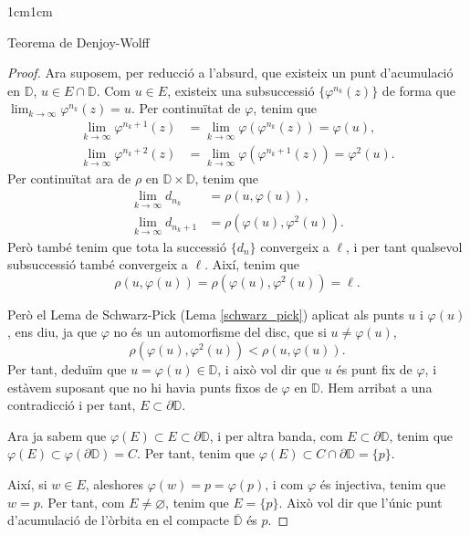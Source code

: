 \begin{adjustwidth}{1cm}{1cm}
\begin{subsection}{Teorema de Denjoy-Wolff}
\begin{proof}
        Ara suposem, per reducció a l'absurd, que existeix un punt d'acumulació en $\mathbb{D}$, $u\in E\cap \mathbb{D}$. Com $u\in E$, existeix una subsuccessió $\{\varphi^{n_k}(z)\}$ de forma que $\displaystyle\lim_{k\to\infty}\varphi^{n_k}(z)=u$. Per continuïtat de $\varphi$, tenim que 
        \begin{equation*}
            \begin{aligned}
                \lim_{k\to\infty}\varphi^{n_k+1}(z) &=\lim_{k\to\infty}\varphi(\varphi^{n_k}(z))=\varphi(u), \\
                \lim_{k\to\infty}\varphi^{n_k+2}(z) &=\lim_{k\to\infty}\varphi(\varphi^{n_k+1}(z))=\varphi^2(u).
            \end{aligned}
        \end{equation*}
        Per continuïtat ara de $\rho$ en $\mathbb{D}\times \mathbb{D}$, tenim que 
        \begin{equation*}
            \begin{aligned}
                \lim_{k\to\infty}d_{n_k} &=\rho(u,\varphi(u)), \\
                \lim_{k\to\infty}d_{n_k+1} &=\rho(\varphi(u),\varphi^2(u)).
            \end{aligned}
        \end{equation*}
        Però també tenim que tota la successió $\{d_n\}$ convergeix a $\ell$, i per tant qualsevol subsuccessió també convergeix a $\ell$. Així, tenim que 
        \[
            \rho(u,\varphi(u))=\rho(\varphi(u),\varphi^2(u))=\ell.
        \]

        Però el Lema de Schwarz-Pick (Lema \ref{schwarz_pick}) aplicat als punts $u$ i $\varphi(u)$, ens diu, ja que $\varphi$ no és un automorfisme del disc, que si $u\neq \varphi(u)$,
        \[
            \rho(\varphi(u),\varphi^2(u))<\rho(u, \varphi(u)).
        \]
        Per tant, deduïm que $u=\varphi(u)\in \mathbb{D}$, i això vol dir que $u$ és punt fix de $\varphi$, i estàvem suposant que no hi havia punts fixos de $\varphi$ en $\mathbb{D}$. Hem arribat a una contradicció i per tant, $E\subset \partial \mathbb{D}$.

        Ara ja sabem que $\varphi(E)\subset E\subset \partial \mathbb{D}$, i per altra banda, com $E\subset \partial \mathbb{D}$, tenim que $\varphi(E)\subset \varphi(\partial \mathbb{D})=C$. Per tant, tenim que $\varphi(E)\subset C\cap\partial \mathbb{D}=\{p\}$.
        
        Així, si $w\in E$, aleshores $\varphi(w)=p=\varphi(p)$, i com $\varphi$ és injectiva, tenim que $w=p$. Per tant, com $E\neq \varnothing$, tenim que $E=\{p\}$. Això vol dir que l'únic punt d'acumulació de l'òrbita en el compacte $\overline{\mathbb{D}}$ és $p$.


\end{proof}
\end{subsection}
\end{adjustwidth}
